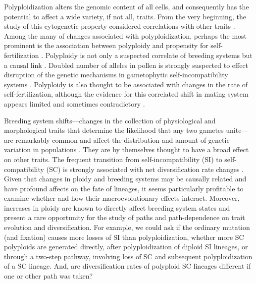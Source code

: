 Polyploidization alters the genomic content of all cells, and consequently has the potential to affect a wide variety, if not all, traits. 
From the very beginning, the study of this cytogenetic property considered correlations with other traits \citep{stebbins1938}. 
Among the many of changes associated with polyploidization, perhaps the most prominent is the association between polyploidy and propensity for self-fertilization \citep{stebbins1950, barrett1988}.
Polyploidy is not only a suspected correlate of breeding systems but a causal link \citep{stout1942, lewis1947}.
Doubled number of alleles in pollen is strongly suspected to effect disruption of the genetic mechanisms in gametophytic self-incompatibility systems \citep{entani1999, tsukamoto2005, kubo2010}. 
Polyploidy is also thought to be associated with changes in the rate of self-fertilization, although the evidence for this correlated shift in mating system appears limited and sometimes contradictory \citep{barringer2007, barrett2008, husband2008}.

Breeding system shifts---changes in the collection of physiological and morphological traits that determine the likelihood that any two gametes unite---are remarkably common and affect the distribution and amount of genetic variation in populations \citep{stebbins1974,barrett2013}.
They are by themselves thought to have a broad effect on other traits. 
The frequent transition from self-incompatibility (SI) to self-compatibility (SC) is strongly associated with net diversification rate changes \citep{goldberg_2010,devos2014}.
Given that changes in ploidy and breeding systems may be causally related and have  profound affects on the fate of lineages, it seems particularly profitable to examine whether and how their macroevolutionary effects interact.
Moreover,  increases in ploidy are known to directly affect breeding system states and present a rare opportunity for the study of paths and path-dependence on trait evolution and diversification.
For example, we could ask if the ordinary mutation (and fixation) causes more losses of SI than polyploidization, whether more SC polyploids are generated directly, after polyploidization of diploid SI lineages, or through a two-step pathway, involving loss of SC and subsequent polyploidization of a SC lineage.
And, are diversification rates of polyploid SC lineages different if one or other path was taken? \citet{charlesworth1985} 
%
%


